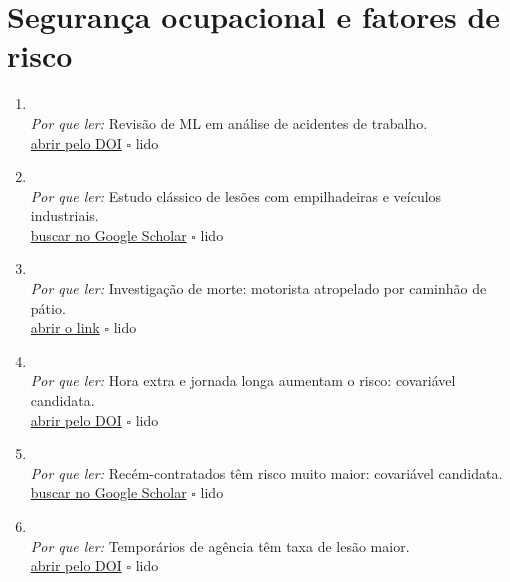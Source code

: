 \section{Segurança ocupacional e fatores de risco}
\begin{enumerate}[leftmargin=*]
  \item {}\\
  \textit{Por que ler:} Revisão de ML em análise de acidentes de trabalho.\\
  \href{https://doi.org/10.1016/j.ssci.2020.104900}{abrir pelo DOI} \hfill $\square$ \textsf{\small lido}
  \item {}\\
  \textit{Por que ler:} Estudo clássico de lesões com empilhadeiras e veículos industriais.\\
  \href{https://scholar.google.com/scholar?q=Injuries+related+to+forklifts+and+other+powered+industrial+vehicles+in+automobile+manufacturing}{buscar no Google Scholar} \hfill $\square$ \textsf{\small lido}
  \item {}\\
  \textit{Por que ler:} Investigação de morte: motorista atropelado por caminhão de pátio.\\
  \href{https://lni.wa.gov/safety-health/safety-research/files/2022/71_214_2022_TruckDriverStruckByYardTractor.pdf}{abrir o link} \hfill $\square$ \textsf{\small lido}
  \item {}\\
  \textit{Por que ler:} Hora extra e jornada longa aumentam o risco: covariável candidata.\\
  \href{https://doi.org/10.1136/oem.2004.016667}{abrir pelo DOI} \hfill $\square$ \textsf{\small lido}
  \item {}\\
  \textit{Por que ler:} Recém-contratados têm risco muito maior: covariável candidata.\\
  \href{https://scholar.google.com/scholar?q=Trial+by+fire\%3A+a+multivariate+examination+of+the+relation+between+job+tenure+and+work+injuries}{buscar no Google Scholar} \hfill $\square$ \textsf{\small lido}
  \item {}\\
  \textit{Por que ler:} Temporários de agência têm taxa de lesão maior.\\
  \href{https://doi.org/10.1002/ajim.20728}{abrir pelo DOI} \hfill $\square$ \textsf{\small lido}
\end{enumerate}


